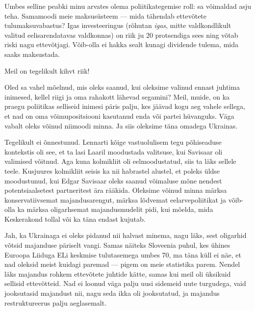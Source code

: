 Umbes selline peabki minu arvates olema poliitikategemise roll: sa 
võimaldad asju teha. Samamoodi meie maksusüsteem --- mida tähendab ettevõtete tulumaksuvabastus? Igas investeeringus (rõhutan \emph{igas}, mitte valdkondlikult valitud 
eelisarendatavas valdkonnas) on riik ju 20 protsendiga sees ning võtab 
riski nagu ettevõtjagi. Võib-olla ei hakka sealt kunagi dividende tulema, mida 
saaks maksustada.

Meil on tegelikult kihvt riik!


Oled sa vahel mõelnud, mis oleks saanud, kui oleksime valinud ennast juhtima 
inimesed, kellel riigi ja oma rahakott lähevad segamini? Meil, muide, on ka 
praegu poliitikas selliseid inimesi päris palju, kes jäävad kogu aeg vahele 
sellega, et nad on oma võimupositsiooni kasutanud enda või partei 
hüvanguks. Väga vabalt oleks võinud niimoodi minna. Ja siis 
oleksime täna omadega Ukrainas.


Tegelikult ei õnnestunud. Lennarti kõige vastuolulisem tegu 
põhiseaduse kontekstis oli see, et ta lasi Laaril moodustada valitsuse, kui 
Savisaar oli valimised võitnud. Aga kuna kolmikliit oli eelmoodustatud, siis ta läks sellele teele. Kusjuures kolmikliit seisis ka nii habrastel alustel, et poleks üldse 
moodustunud, kui Edgar Savisaar oleks saanud 
võimaluse mõne nendest potentsiaalsetest partneritest ära rääkida. Oleksime võinud 
minna märksa konservatiivsemat majandusarengut, märksa lõdvemat eelarvepoliitikat ja võib-olla ka märksa oligarhsemat majandusmudelit pidi, kui 
mõelda, mida Keskerakond tollal või ka täna endast kujutab.


Jah, ka Ukrainaga ei oleks pidanud nii halvast minema, nagu läks, sest
oligarhid võtsid majanduse päriselt vangi. Samas näiteks Sloveenia puhul, kes ühines Euroopa Liiduga ELi keskmise 
tulutasemega umbes 70, ma täna küll ei näe, et nad oleksid meist kuidagi 
paremad --- pigem on meie statistika parem. Nendel läks
majandus rohkem ettevõtete juhtide kätte, samas kui meil oli üksikuid 
sellisid ettevõtteid. Nad ei loonud väga palju uusi sidemeid uute turgudega, 
vaid jooksutasid majandust nii, nagu seda ikka oli jooksutatud, ja majandus 
restruktureerus palju aeglasemalt. 

